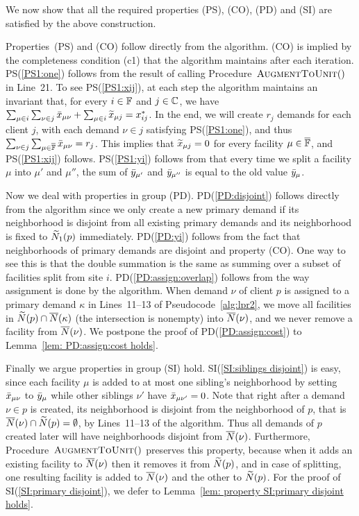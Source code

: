 \documentclass[11pt]{article}
\begin{document}
\medskip

  We now show that all the
required properties (PS), (CO), (PD) and (SI) are satisfied
by the above construction.

Properties~(PS) and (CO) follow directly from the
algorithm. (CO) is implied by the completeness condition
(c1) that the algorithm maintains after each
iteration. PS(\ref{PS1:one}) follows from the result of
calling Procedure~${\textsc{AugmentToUnit}}()$ in Line~21. To see
PS(\ref{PS1:xij}), at each step the algorithm maintains an
invariant that, for every $i\in\mathbb{F}$ and
$j\in\mathbb{C}$, we have $\sum_{\mu\in i}\sum_{\nu \in j}
{\bar x}_{\mu \nu} + \sum_{\mu\in i} {\widetilde x}_{\mu j} =
x_{ij}^\ast$. In the end, we will create $r_j$ demands for
each client $j$, with each demand $\nu\in j$ satisfying
PS(\ref{PS1:one}), and thus $\sum_{\nu\in
  j}\sum_{\mu\in\overline{\mathbb{F}}}{\bar x}_{\mu\nu}=r_j$.  This
implies that ${\widetilde x}_{\mu j}=0$ for every facility
$\mu\in\overline{\mathbb{F}}$, and PS(\ref{PS1:xij}) follows.
PS(\ref{PS1:yi}) follows from that every time we split a
facility $\mu$ into $\mu'$ and $\mu''$, the sum of
${\bar y}_{\mu'}$ and ${\bar y}_{\mu''}$ is equal to the old value
${\bar y}_{\mu}$.

Now we deal with properties in group
(PD). PD(\ref{PD:disjoint}) follows directly from the
algorithm since we only create a new primary demand if its
neighborhood is disjoint from all existing primary demands
and its neighborhood is fixed to ${\widetilde N}_1(p)$
immediately. PD(\ref{PD:yi}) follows from the fact that
neighborhoods of primary demands are disjoint and property
(CO). One way to see this is that the double summation is
the same as summing over a subset of facilities split from
site $i$. PD(\ref{PD:assign:overlap}) follows from the way
assignment is done by the algorithm.  When demand $\nu$ of
client $p$ is assigned to a primary demand $\kappa$ in
Lines~11--13 of Pseudocode~\ref{alg:lpr2}, we move all
facilities in ${\widetilde N}(p)\cap {\overline{N}}(\kappa)$ (the
intersection is nonempty) into ${\overline{N}}(\nu)$, and we never
remove a facility from ${\overline{N}}(\nu)$.  We postpone the proof
of PD(\ref{PD:assign:cost}) to Lemma~\ref{lem:
  PD:assign:cost holds}.

Finally we argue properties in group (SI)
hold. SI(\ref{SI:siblings disjoint}) is easy, since each
facility $\mu$ is added to at most one sibling's
neighborhood by setting ${\bar x}_{\mu\nu}$ to ${\bar y}_\mu$
while other siblings $\nu'$ have ${\bar x}_{\mu\nu'}=0$. Note
that right after a demand $\nu\in p$ is created, its
neighborhood is disjoint from the neighborhood of $p$, that
is ${\overline{N}}(\nu)\cap {\widetilde N}(p) = \emptyset$, by
Lines~11--13 of the algorithm. Thus all demands of $p$
created later will have neighborhoods disjoint from
${\overline{N}}(\nu)$. Furthermore, Procedure~${\textsc{AugmentToUnit}}()$
preserves this property, because when it adds an existing
facility to ${\overline{N}}(\nu)$ then it removes it from
${\widetilde N}(p)$, and in case of splitting, one resulting
facility is added to ${\overline{N}}(\nu)$ and the other to
${\widetilde N}(p)$. For the proof of SI(\ref{SI:primary
  disjoint}), we defer to Lemma~\ref{lem: property SI:primary
  disjoint holds}.
\end{document}
